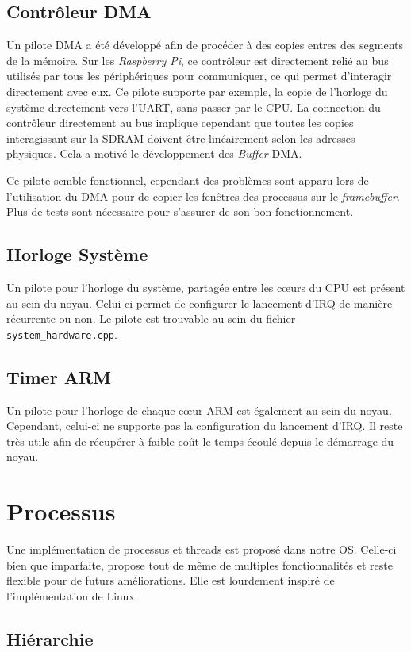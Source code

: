 \documentclass[french, 12pt]{article}
\newcommand{\rpi}{\emph{Raspberry Pi}}
\begin{document}
\subsection{Contrôleur DMA}
Un pilote DMA a été développé afin de procéder à des copies entres des segments
de la mémoire. Sur les \rpi{}, ce contrôleur est directement relié au bus
utilisés par tous les périphériques pour communiquer, ce qui permet d'interagir
directement avec eux. Ce pilote supporte par exemple, la copie de l'horloge du
système directement vers l'UART, sans passer par le CPU. La connection du
contrôleur directement au bus implique cependant que toutes les copies
interagissant sur la SDRAM doivent être linéairement selon les adresses
physiques. Cela a motivé le développement des \textit{Buffer} DMA.

Ce pilote semble fonctionnel, cependant des problèmes sont apparu lors de
l'utilisation du DMA pour de copier les fenêtres des processus sur le
\textit{framebuffer}. Plus de tests sont nécessaire pour s'assurer de son bon
fonctionnement.

\subsection{Horloge Système}
Un pilote pour l'horloge du système, partagée entre les cœurs du CPU est présent
au sein du noyau. Celui-ci permet de configurer le lancement d'IRQ de manière
récurrente ou non. Le pilote est trouvable au sein du fichier
\texttt{system\_hardware.cpp}.

\subsection{Timer ARM}
Un pilote pour l'horloge de chaque cœur ARM est également au sein du noyau.
Cependant, celui-ci ne supporte pas la configuration du lancement d'IRQ. Il
reste très utile afin de récupérer à faible coût le temps écoulé depuis le
démarrage du noyau.

\section{Processus}

Une implémentation de processus et threads est proposé dans notre OS. Celle-ci bien que imparfaite, propose tout de même de multiples fonctionnalités et reste flexible pour de futurs améliorations. Elle est lourdement inspiré de l'implémentation de Linux.

\subsection{Hiérarchie}
\end{document}
